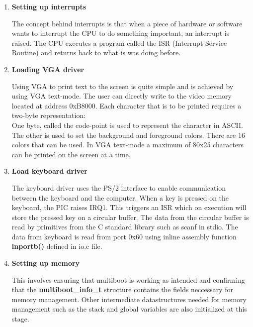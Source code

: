 \begin{enumerate}

	\item \textbf{Setting up interrupts}
	\begin{flushleft}
		The concept behind interrupts is that when a piece of hardware or software wants to
		interrupt the CPU to do something important, an interrupt is raised. The CPU
		executes a program called the ISR (Interrupt Service Routine) and returns back to
		what is was doing before.
	\end{flushleft}

	\item \textbf{Loading VGA driver}
	\begin{flushleft}
		Using VGA to print text to the screen is quite simple and is achieved by using
		VGA text-mode. The user can directly write to the video memory located at
		address 0xB8000. Each character that is to be printed requires a two-byte
		representation:\\
		One byte, called the code-point is used to represent the character in ASCII.\\
		The other is used to set the background and foreground colors. There are 16
		colors that can be used.
		In VGA text-mode a maximum of 80x25 characters can be printed on the
		screen at a time.
	\end{flushleft}

	\item \textbf{Load keyboard driver}
	\begin{flushleft}
		The keyboard driver uses the PS/2 interface to enable communication between the keyboard and the computer. When a key is pressed 
		on the keyboard, the PIC raises IRQ1. This triggers an ISR which on execution will store the pressed key on a circular buffer.
		The data from the circular buffer is read by primitives from the C standard library such as scanf in stdio. The data from keyboard is
		read from port 0x60 using inline assembly function \textbf{inportb()} defined in io.c file.
	\end{flushleft}

	\item \textbf{Setting up memory}
	\begin{flushleft}
		This involves ensuring that multiboot is working as intended and confirming that the 
		\textbf{multiboot\_info\_t} structure contains the fields neccessary for memory management.
		 Other intermediate datastructures needed for memory management such as the stack and global variables
		are also initialized at this stage.
	\end{flushleft}
\end{enumerate}

